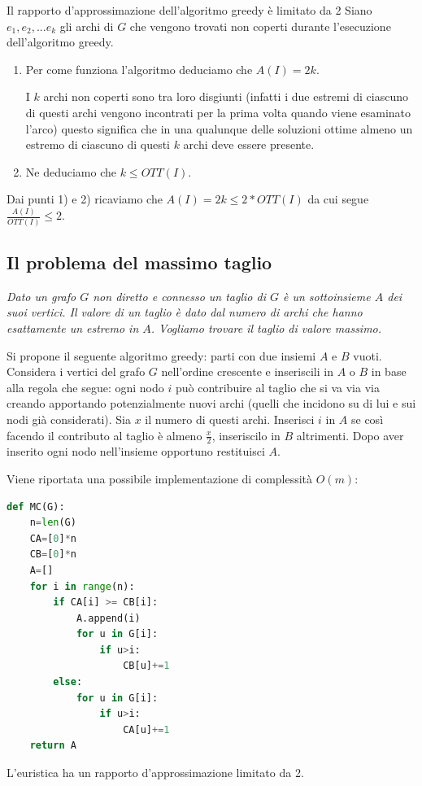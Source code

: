 \begin{Lemma}{Il rapporto d'approssimazione dell'algoritmo greedy è limitato da 2}{}
    Siano $e_1, e_2, ... e_k$ gli archi di $G$ che vengono trovati non coperti durante l'esecuzione dell'algoritmo greedy.
    \begin{enumerate}
        \item Per come funziona l'algoritmo deduciamo che $A(I) = 2k$. 
        
        I $k$ archi non coperti sono tra loro disgiunti (infatti i due estremi di ciascuno di questi archi vengono incontrati per la prima volta quando viene esaminato l'arco) questo significa che in una qualunque delle soluzioni ottime almeno un estremo di ciascuno di questi $k$ archi deve essere presente.

        \item Ne deduciamo che $k\leq OTT(I)$.
    \end{enumerate}

    Dai punti 1) e 2) ricaviamo che $A(I) = 2k\leq 2*OTT(I)$ da cui segue $\frac{A(I)}{OTT(I)}\leq 2$.
\end{Lemma}

\subsection{Il problema del massimo taglio}
\textit{Dato un grafo $G$ non diretto e connesso un taglio di $G$ è un sottoinsieme $A$ dei suoi vertici. Il valore di un taglio è dato dal numero di archi che hanno esattamente un estremo in $A$. Vogliamo trovare il taglio di valore massimo.}

Si propone il seguente algoritmo greedy: parti con due insiemi $A$ e $B$ vuoti. Considera i vertici del grafo $G$ nell'ordine crescente e inseriscili in $A$ o $B$ in base alla regola che segue: ogni nodo $i$ può contribuire al taglio che si va via via creando apportando potenzialmente nuovi archi (quelli che incidono su di lui e sui nodi già considerati).
Sia $x$ il numero di questi archi. Inserisci $i$ in $A$ se così facendo il contributo al taglio è almeno $\frac{x}{2}$, inseriscilo in $B$ altrimenti. Dopo aver inserito ogni nodo nell'insieme opportuno restituisci $A$. 

Viene riportata una possibile implementazione di complessità $O(m)$:
\begin{lstlisting}[language=Python]
def MC(G): 
    n=len(G) 
    CA=[0]*n 
    CB=[0]*n
    A=[] 
    for i in range(n): 
        if CA[i] >= CB[i]: 
            A.append(i) 
            for u in G[i]: 
                if u>i: 
                    CB[u]+=1 
        else: 
            for u in G[i]:
                if u>i: 
                    CA[u]+=1
    return A
\end{lstlisting}
L'euristica ha un rapporto d'approssimazione limitato da 2.

